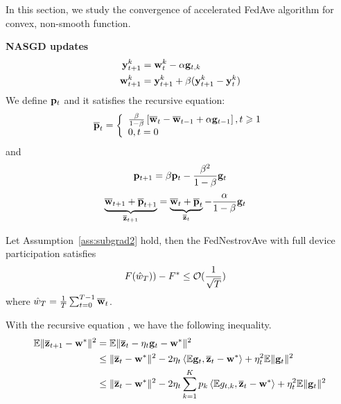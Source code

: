 
In this section, we study the convergence of accelerated FedAve 
algorithm for convex, non-smooth function.

\textbf{NASGD updates}
\begin{align}
	{\mathbf{y}}^k_{t+1} &= {\mathbf{w}}^k_{t} - \alpha  {\mathbf{g}}_{t,k}	\\
	{\mathbf{w}}^k_{t+1} & = {\mathbf{y}}^k_{t+1} + \beta({\mathbf{y}}^k_{t+1} - {\mathbf{y}}^k_{t})
\end{align}
We define ${\mathbf{p}}_t$ and it satisfies the recursive equation:
\begin{align}
	{\overline{\mathbf{p}}}_{t}=\left\{\begin{array}{l}\frac{\beta}{1-\beta}\left[{\overline{\mathbf{w}}}_{t}-{\overline{\mathbf{w}}}_{t-1}+\alpha {\mathbf{g}}_{t-1}\right], t \geqslant 1 \\ 0, t=0\end{array}\right.
\end{align}
and 
\begin{align}
	{\mathbf{p}}_{t+1} =  \beta {\mathbf{p}}_t - \frac{\beta^2}{1 - \beta} {\mathbf{g}}_t
	\label{eq:recursivep}
\end{align}
\begin{align}
	\underbrace{\overline{{\mathbf{w}}}_{t+1} + \overline{{\mathbf{p}}}_{t+1}}_{\overline{{\mathbf{z}}}_{t+1}} &= \underbrace{\overline{{\mathbf{w}}}_{t} + \overline{{\mathbf{p}}}_{t}}_{\overline{{\mathbf{z}}}_{t}} - \frac{\alpha}{1- \beta} {\mathbf{g}}_t
	\label{eq:nasgdzt}
\end{align}


\begin{theorem}
	Let Assumption~\ref{ass:subgrad2} hold, 
	then the FedNestrovAve with full device participation satisfies
	\begin{align}
		 F(\hat{w}_T)) - F^* &\leq {\mathcal{O}}(\frac{1}{\sqrt{T} })
	\end{align}
	where $\hat{w}_T = \frac{1}{T}\sum_{t=0}^{T-1} {\overline{\mathbf{w}}}_t$.
	\label{th:nasgcvxnonsmoth}
\end{theorem}

With the recursive equation \eq{\ref{eq:nasgdzt}}, we have the following 
inequality.
\begin{align}
	\mathbb{E}\|\overline{{\mathbf{z}}}_{t+1} - {\mathbf{w}}^* \|^2  &= \mathbb{E}\|\overline{{\mathbf{z}}}_{t} - \eta_t{\mathbf{g}}_t - {\mathbf{w}}^* \|^2 \\
& \leq  \| \overline{{\mathbf{z}}}_{t} - {\mathbf{w}}^*\|^2  - 2\eta_t\left<\mathbb{E}{\mathbf{g}}_t, \overline{{\mathbf{z}}}_{t} - {\mathbf{w}}^*\right> +  \eta_t^2\mathbb{E}\|{\mathbf{g}}_t\|^2 \\
& \leq  \| \overline{{\mathbf{z}}}_{t} - {\mathbf{w}}^*\|^2  - 2\eta_t\sum_{k=1}^K p_k\left<\mathbb{E} g_{t,k}, \overline{{\mathbf{z}}}_{t} - {\mathbf{w}}^*\right> +  \eta_t^2\mathbb{E}\|{\mathbf{g}}_t\|^2 \label{eq:nagcvx1}
\end{align}

